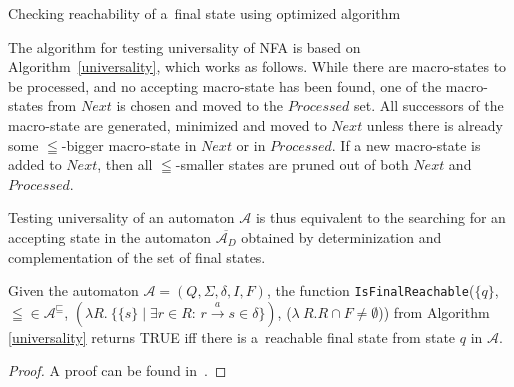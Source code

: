 \begin{algorithm}[ht!]
		\BlankLine
		\BlankLine
		\caption{Checking reachability of a~final state using optimized
		algorithm~\cite{tacas}}\label{universality}
	\end{algorithm}
	
The algorithm for testing universality of NFA is based on
Algorithm~\ref{universality}, which works as follows.
While there are macro-states to be processed, and no accepting macro-state has
been found, one of the macro-states from $\mathit{Next}$ is chosen and moved to
the $\mathit{Processed}$ set. All successors of the macro-state are generated,
minimized and moved to $\mathit{Next}$ unless there is already some
$\leqq$-bigger macro-state in $\mathit{Next}$ or in $\mathit{Processed}$. If
a new macro-state is added to $\mathit{Next}$, then all $\leqq$-smaller states
are pruned out of both $\mathit{Next}$ and $\mathit{Processed}$.

Testing universality of an automaton $\mathcal{A}$ is thus equivalent to
the searching for an accepting state in the automaton $\overline{\mathcal{A}_D}$
obtained by determinization and complementation of the set of final states.
	
\begin{lemma}\label{search-is-correct}
 Given the automaton $\mathcal{A} = (Q, \Sigma, \delta, I, F)$, the function
 \texttt{IsFinalReachable}($\{q\}$, $\leqq \in \mathcal{A}^\sqsubseteq$,
 $(\lambda R.\ \{\{s\} \mid \exists r \in R:\, r \overset{a}{\rightarrow} s
 \in \delta\})$, ($\lambda\ R.
 R \cap F \neq \emptyset$)) from Algorithm \ref{universality} returns
 \textsc{TRUE} iff there is a~reachable final state from state $q$ in $\mathcal{A}$.
\end{lemma}
\begin{proof}
 A proof can be found in~\cite{raskin}.
\end{proof}

